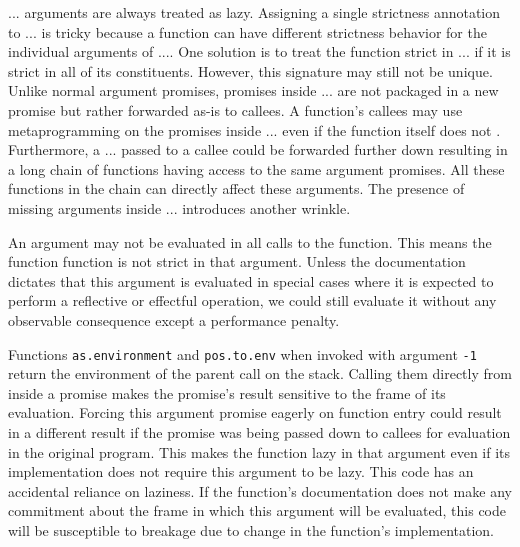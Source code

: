 \documentclass[screen,acmsmall]{acmart}
\newcommand{\code}[1]{\lstinline[style=R]|#1|\xspace}
\begin{document}
$...$ arguments are always treated as lazy. Assigning a single strictness
annotation to $...$ is tricky because a function can have different strictness
behavior for the individual arguments of $...$. One solution is to treat the
function strict in $...$ if it is strict in all of its constituents. However,
this signature may still not be unique. Unlike normal argument promises,
promises inside $...$ are not packaged in a new promise but rather forwarded
as-is to callees. A function's callees may use metaprogramming on the promises
inside $...$ even if the function itself does not . Furthermore, a $...$ passed
to a callee could be forwarded further down resulting in a long chain of
functions having access to the same argument promises. All these functions in
the chain can directly affect these arguments. The presence of missing arguments
inside $...$ introduces another wrinkle.

An argument may not be evaluated in all calls to the function. This means the
function function is not strict in that argument. Unless the documentation
dictates that this argument is evaluated in special cases where it is expected
to perform a reflective or effectful operation, we could still evaluate it
without any observable consequence except a performance penalty.

Functions \code{as.environment} and \code{pos.to.env} when invoked with argument
\code{-1} return the environment of the parent call on the stack. Calling them
directly from inside a promise makes the promise's result sensitive to the frame
of its evaluation. Forcing this argument promise eagerly on function entry could
result in a different result if the promise was being passed down to callees for
evaluation in the original program. This makes the function lazy in that
argument even if its implementation does not require this argument to be lazy.
This code has an accidental reliance on laziness. If the function's
documentation does not make any commitment about the frame in which this
argument will be evaluated, this code will be susceptible to breakage due to
change in the function's implementation.
\end{document}
